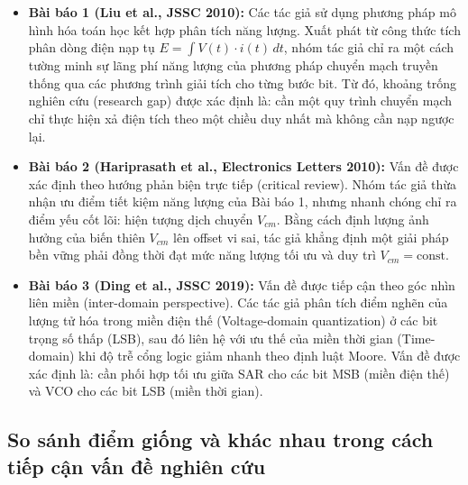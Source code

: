 \documentclass[12pt,a4paper]{article}
\begin{document}
\begin{itemize}
    \item \textbf{Bài báo 1 (Liu et al., JSSC 2010):} Các tác giả sử dụng phương pháp mô hình hóa toán học kết hợp phân tích năng lượng. Xuất phát từ công thức tích phân dòng điện nạp tụ $E = \int V(t) \cdot i(t) \, dt$, nhóm tác giả chỉ ra một cách tường minh sự lãng phí năng lượng của phương pháp chuyển mạch truyền thống qua các phương trình giải tích cho từng bước bit. Từ đó, khoảng trống nghiên cứu (research gap) được xác định là: cần một quy trình chuyển mạch chỉ thực hiện xả điện tích theo một chiều duy nhất mà không cần nạp ngược lại.
    \item \textbf{Bài báo 2 (Hariprasath et al., Electronics Letters 2010):} Vấn đề được xác định theo hướng phản biện trực tiếp (critical review). Nhóm tác giả thừa nhận ưu điểm tiết kiệm năng lượng của Bài báo 1, nhưng nhanh chóng chỉ ra điểm yếu cốt lõi: hiện tượng dịch chuyển $V_{cm}$. Bằng cách định lượng ảnh hưởng của biến thiên $V_{cm}$ lên offset vi sai, tác giả khẳng định một giải pháp bền vững phải đồng thời đạt mức năng lượng tối ưu và duy trì $V_{cm} = \text{const}$.
    \item \textbf{Bài báo 3 (Ding et al., JSSC 2019):} Vấn đề được tiếp cận theo góc nhìn liên miền (inter-domain perspective). Các tác giả phân tích điểm nghẽn của lượng tử hóa trong miền điện thế (Voltage-domain quantization) ở các bit trọng số thấp (LSB), sau đó liên hệ với ưu thế của miền thời gian (Time-domain) khi độ trễ cổng logic giảm nhanh theo định luật Moore. Vấn đề được xác định là: cần phối hợp tối ưu giữa SAR cho các bit MSB (miền điện thế) và VCO cho các bit LSB (miền thời gian).
\end{itemize}

\subsection{So sánh điểm giống và khác nhau trong cách tiếp cận vấn đề nghiên cứu}
\end{document}
